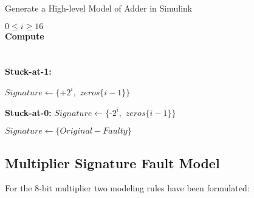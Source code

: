 \begin{algorithm}

\caption{Generate a High-level Model of  Adder in Simulink}
\begin{algorithmic}
\label{algo-adder}
\REQUIRE $0\leq i \geq16$ \\
\textbf{Compute}\\ 
\hspace{1.5cm}{$Original =  A $ $ $+$ $ $ B$ } \\
\hspace{1.5cm}{$Faulty =  A $ $ $+$ $ $ B$ } \\
\vspace{0.20 cm }
\textbf{Stuck-at-1:}
\vspace{0.20 cm }

\vspace{0.10 cm }
\STATE $Signature \leftarrow  \{$+$ 2^{i},$ $ $$zeros$$\{i-1\}\}$
\vspace{0.10 cm }
\ENDIF
\vspace{0.20 cm }

\textbf{Stuck-at-0:}
\vspace{0.20 cm }
\vspace{0.10 cm }
\STATE $Signature \leftarrow  \{$-$ 2^{i},$ $ $$zeros$$\{i-1\}\}$
\vspace{0.10 cm }
\ENDIF



\vspace{0.20 cm }

\vspace{0.20 cm }
\vspace{0.10 cm }
\STATE $Signature \leftarrow  \{$$Original-Faulty$$\}$
\vspace{0.10 cm }
\ENDIF



\end{algorithmic}
\end{algorithm}







\subsection{Multiplier Signature Fault Model}

For the 8-bit multiplier two modeling rules have been formulated:


